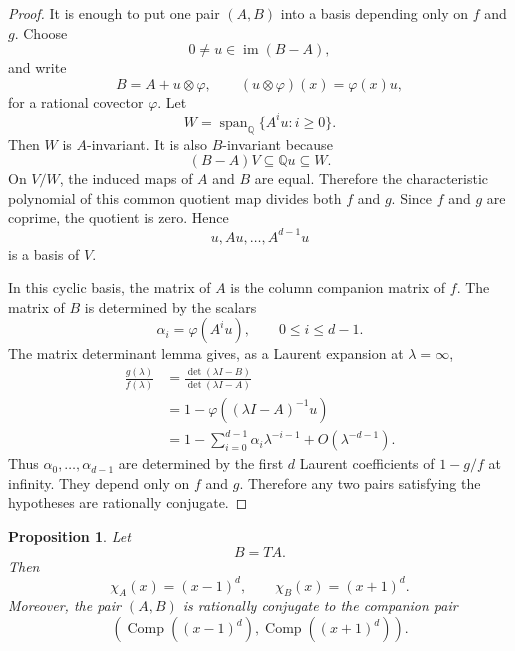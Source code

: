 \documentclass[a4paper,11pt]{amsart}
\newtheorem{proposition}[theorem]{Proposition}
\theoremstyle{remark}
\newcommand{\Q}{\mathbb Q}
\DeclareMathOperator{\Comp}{Comp}
\DeclareMathOperator{\im}{im}
\DeclareMathOperator{\Span}{span}
\numberwithin{equation}{section}
\begin{document}
\begin{proof}
It is enough to put one pair \((A,B)\) into a basis depending only on \(f\) and \(g\).  Choose
\[
        0\ne u\in\im(B-A),
\]
and write
\[
        B=A+u\otimes\varphi,
        \qquad
        (u\otimes\varphi)(x)=\varphi(x)u,
\]
for a rational covector \(\varphi\).  Let
\[
        W=\Span_{\Q}\{A^iu:i\ge0\}.
\]
Then \(W\) is \(A\)-invariant.  It is also \(B\)-invariant because
\[
        (B-A)V\subseteq \Q u\subseteq W.
\]
On \(V/W\), the induced maps of \(A\) and \(B\) are equal.  Therefore the characteristic polynomial of this common quotient map divides both \(f\) and \(g\).  Since \(f\) and \(g\) are coprime, the quotient is zero.  Hence
\[
        u,Au,\ldots,A^{d-1}u
\]
is a basis of \(V\).

In this cyclic basis, the matrix of \(A\) is the column companion matrix of \(f\).  The matrix of \(B\) is determined by the scalars
\[
        \alpha_i=\varphi(A^iu),
        \qquad 0\le i\le d-1.
\]
The matrix determinant lemma gives, as a Laurent expansion at \(\lambda=\infty\),
\[
\begin{aligned}
        \frac{g(\lambda)}{f(\lambda)}
        &=
        \frac{\det(\lambda I-B)}{\det(\lambda I-A)}       \\
        &=
        1-\varphi((\lambda I-A)^{-1}u)                    \\
        &=
        1-\sum_{i=0}^{d-1}\alpha_i\lambda^{-i-1}
        +O(\lambda^{-d-1}).
\end{aligned}
\]
Thus \(\alpha_0,\ldots,\alpha_{d-1}\) are determined by the first \(d\) Laurent coefficients of \(1-g/f\) at infinity.  They depend only on \(f\) and \(g\).  Therefore any two pairs satisfying the hypotheses are rationally conjugate.
\end{proof}

\begin{proposition}\label{prop:B-characteristic}
Let
\[
        B=TA.
\]
Then
\[
        \chi_A(x)=(x-1)^d,
        \qquad
        \chi_B(x)=(x+1)^d.
\]
Moreover, the pair \((A,B)\) is rationally conjugate to the companion pair
\[
        \left(\Comp((x-1)^d),\Comp((x+1)^d)\right).
\]
\end{proposition}
\end{document}
